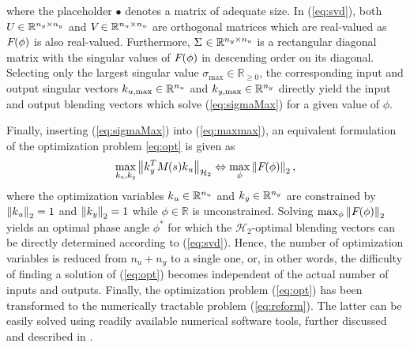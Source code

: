 \documentclass[aerospace,article,submit,moreauthors,pdftex,10pt,a4paper]{Definitions/mdpi}
\begin{document}
%
where the placeholder $\bullet$ denotes a matrix of adequate size.
In (\ref{eq:svd}), both
$\aemat{U}{} \in \mathbb{R}^{n_y \times n_y}$ and 
$\aemat{V}{} \in \mathbb{R}^{n_u \times n_u}$ are
orthogonal matrices which are real-valued as $\aemat{F}{}(\phi)$ is also real-valued.
Furthermore, $\aemat{\Sigma}{} \in \mathbb{R}^{n_y \times n_u}$ is a rectangular diagonal matrix with the singular values of $\aemat{F}{}(\phi)$ in descending order on its diagonal.
Selecting only the largest singular value $\sigma_{\text{max}} \in \mathbb{R}_{\geq 0}$, the corresponding input and output singular vectors $\aevec{k}{u,\text{max}} \in \mathbb{R}^{n_u}$ and $\aevec{k}{y,\text{max}} \in \mathbb{R}^{n_y}$ directly yield the input and output blending vectors which solve (\ref{eq:sigmaMax}) for a given value of $\phi$.

Finally, inserting (\ref{eq:sigmaMax}) into (\ref{eq:maxmax}), an equivalent formulation of the optimization problem \eqref{eq:opt} is given as
%
\begin{align}
\label{eq:reform}
\max_{\aevec{k}{u},\aevec{k}{y}} 
\Hnorm{ \aevec{k}{y}^T \aemat{M}{}(s) \aevec{k}{u} }{2}
\Leftrightarrow
\max_{\phi} \norm{\aemat{F}{}(\phi)}{2},
\end{align}
%
where the optimization variables
$\aevec{k}{u} \in \mathbb{R}^{n_u}$ and 
$\aevec{k}{y} \in \mathbb{R}^{n_y}$ are constrained by
$\norm{\aevec{k}{u}}{2}=1$ and $\norm{\aevec{k}{y}}{2}=1$
while 
$\phi \in \mathbb{R}$ is unconstrained.
Solving $\max_{\phi} \norm{\aemat{F}{}(\phi)}{2}$ yields an optimal phase angle $\phi^*$ for which the $\mathcal{H}_2$-optimal blending vectors can be directly determined according to (\ref{eq:svd}).
Hence, the number of optimization variables is reduced from $n_u+n_y$ to a single one, or, in other words, the  difficulty of finding a solution of (\ref{eq:opt}) becomes independent of the actual number of inputs and outputs.
Finally, the optimization problem (\ref{eq:opt}) has been transformed to the numerically tractable problem (\ref{eq:reform}). The latter can be easily solved using readily available numerical software tools, further discussed and described in \cite{Pusch18a}.
\end{document}
